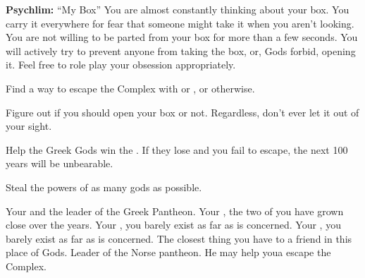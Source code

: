 \documentclass[char]{guardians}
\begin{document}
\begin{itemz}[Notes]
  \item\textbf{Psychlim:} ``My Box'' You are almost constantly thinking about your box. You carry it everywhere for fear that someone might take it when you aren't looking. You are not willing to be parted from your box for more than a few seconds. You will actively try to prevent anyone from taking the box, or, Gods forbid, opening it. Feel free to role play your obsession appropriately.
\end{itemz}

\begin{itemz}[Goals]
  \item Find a way to escape the Complex with \cUnity{} or \cOdin{}, or otherwise.
  \item Figure out if you should open your box or not. Regardless, don't ever let it out of your sight.
  \item Help the Greek Gods win the \pGames{}. If they lose and you fail to escape, the next 100 years will be unbearable.
  \item Steal the powers of as many gods as possible.
\end{itemz}


\begin{contacts}
  \contact{\cZeus{}} Your \cZeus{\parent} and the leader of the Greek Pantheon.
  \contact{\cHera{}} Your \cHera{\parent}, the two of you have grown close over the years.
  \contact{\cAthena{}} Your \cAthena{\sibling}, you barely exist as far as \cAthena{\they} is concerned.
  \contact{\cHephaestus{}} Your \cHephaestus{\sibling}, you barely exist as far as \cHephaestus{\they} is concerned.
  \contact{\cWarden{}} The closest thing you have to a friend in this place of Gods.
  \contact{\cOdin{}} Leader of the Norse pantheon. He may help youa escape the Complex.
\end{contacts}
\end{document}
